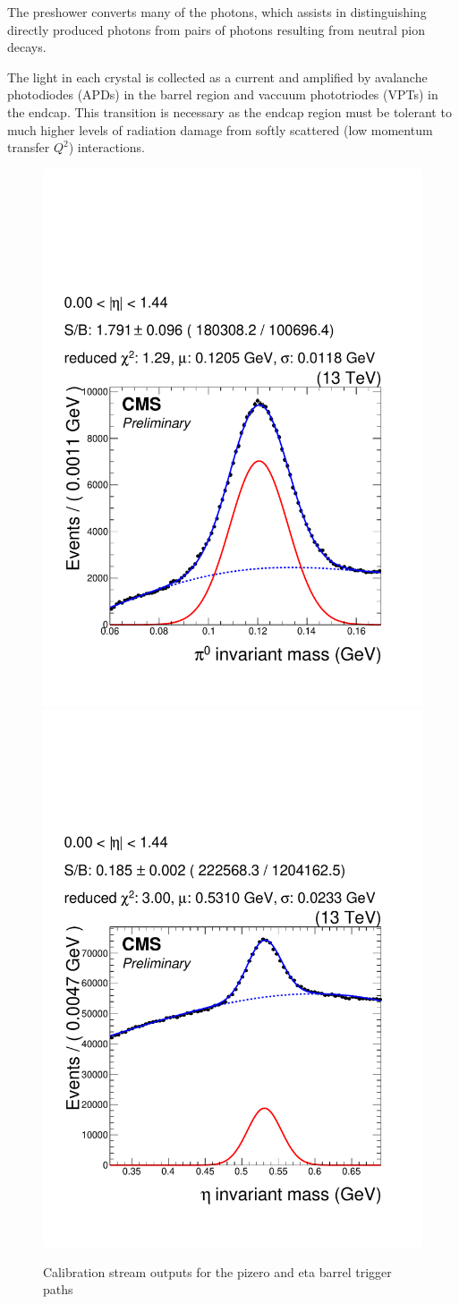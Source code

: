 The preshower converts many of the photons, 
which assists in distinguishing directly produced photons from pairs
of photons resulting from neutral pion decays. 

The light in each crystal is collected as a current 
and amplified by avalanche photodiodes (APDs) in the barrel
region and vaccuum phototriodes (VPTs) in the endcap. This transition is
necessary as the endcap region must be tolerant to much
higher levels of radiation damage from softly scattered (low momentum transfer $Q^2$)
interactions. 

\begin{figure}
\begin{center}
\includegraphics[width=.45\textwidth]{pics/pizero_eb}
\includegraphics[width=.45\textwidth]{pics/eta_eb_2015b}
\end{center}
\caption{Calibration stream outputs for the pizero and eta barrel trigger paths}
\label{fig:pizero_eta}
\end{figure}

